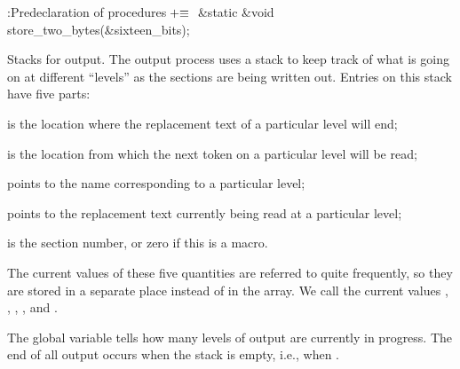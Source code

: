 \B{}:Predeclaration of procedures\X${}\mathrel+\equiv{}$\5
\&{static} \&{void} \\{store\_two\_bytes}(\&{sixteen\_bits});\par
\fi

Stacks for output.  The output process uses a stack to keep track
of what is going on at different ``levels'' as the sections are being
written out.  Entries on this stack have five parts:

\yskip\hang {} is the  location where the
replacement
text of a particular level will end;

\hang {} is the  location from which the
next token
on a particular level will be read;

\hang {} points to the name corresponding to a particular
level;

\hang {} points to the replacement text currently being read
at a particular level;

\hang {} is the section number, or zero if this is a
macro.

\yskip\noindent The current values of these five quantities are referred to
quite frequently, so they are stored in a separate place instead of in
the  array. We call the current values , ,
, , and .

The global variable  tells how many levels of output are
currently in progress. The end of all output occurs when the stack is
empty, i.e., when .

